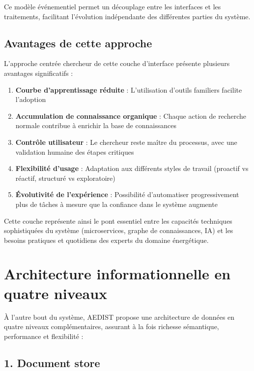 \documentclass[a4paper,11pt]{report}
\providecommand{\tightlist}{\setlength{\itemsep}{0pt}\setlength{\parskip}{0pt}}
\begin{document}
Ce modèle événementiel permet un découplage entre les interfaces et les traitements, facilitant l'évolution indépendante des différentes parties du système.

\subsection{Avantages de cette approche}\label{avantages-de-cette-approche}

L'approche centrée chercheur de cette couche d'interface présente plusieurs avantages significatifs :

\begin{enumerate}
\def\labelenumi{\arabic{enumi}.}
\tightlist
\item
  \textbf{Courbe d'apprentissage réduite} : L'utilisation d'outils familiers facilite l'adoption
\item
  \textbf{Accumulation de connaissance organique} : Chaque action de recherche normale contribue à enrichir la base de connaissances
\item
  \textbf{Contrôle utilisateur} : Le chercheur reste maître du processus, avec une validation humaine des étapes critiques
\item
  \textbf{Flexibilité d'usage} : Adaptation aux différents styles de travail (proactif vs réactif, structuré vs exploratoire)
\item
  \textbf{Évolutivité de l'expérience} : Possibilité d'automatiser progressivement plus de tâches à mesure que la confiance dans le système augmente
\end{enumerate}

Cette couche représente ainsi le pont essentiel entre les capacités techniques sophistiquées du système (microservices, graphe de connaissances, IA) et les besoins pratiques et quotidiens des experts du domaine énergétique.

\section{Architecture informationnelle en quatre niveaux}\label{architecture-informationnelle-en-quatre-niveaux}

À l'autre bout du système, AEDIST propose une architecture de données en quatre niveaux complémentaires, assurant à la fois richesse sémantique, performance et flexibilité :

\subsection{1. Document store}\label{document-store}
\end{document}
